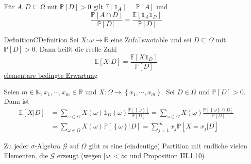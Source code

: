 		 Für $ A, D \subseteq \Omega   $ mit $ \mathbb{P} \left[ D \right]> 0 $ gilt $ \mathbb{E} [ \mathbb{1}_A ] = \mathbb{P} \left[ A \right]$ und 
		 $$ \frac{ \mathbb{P} \left[ A \cap D \right]}{ \mathbb{P} \left[ D \right]} = \frac{ \mathbb{E} \left[ \mathbb{1}_{A} \mathbb{1}_{D} \right]}{ \mathbb{P} \left[ D \right]}  $$
		 
\begin{ibox}[2.4]{Definition}{CDefinition}
    Sei $ X : \omega  \to \mathbb{R} $ eine Zufallsvariable und sei $ D \subseteq \Omega  $ mit $ \mathbb{P} \left[ D \right] >0 $. Dann
		heißt die reelle Zahl  
		$$ \mathbb{E} \left[ X | D \right] = \frac{ \mathbb{E} \left[ X \mathbb{1}_D \right]}{ \mathbb{P} \left[ D \right]}  $$
		\underline{elementare bedingte Erwartung}
\end{ibox}

Seien $ m \in \mathbb{N}, x_1 , \cdots,  x_m \in \mathbb{R} $  und $ X : \Omega  \to \left\{ x_1 , \cdots,  x_m \right\} $. Sei $ D \in 
\Omega $ und $ \mathbb{P} \left[ D \right] >0 $. Dann ist 
\begin{align*}
	\mathbb{E} \left[ X | D \right] &= \sum_{\omega \in \Omega } X (\omega) \mathbb{1}_{D} (\omega) \frac{\mathbb{P} \left[ \left\{ \omega  \right\} \right]}{\mathbb{P} \left[ D \right]}  =  \sum_{\omega \in \Omega }X (\omega) \frac{\mathbb{P} \left[ \left\{ \omega  \right\} \cap D \right]}{ \mathbb{P} \left[ D \right]} \\ 
	&= \sum_{\omega \in \Omega } X (\omega) \mathbb{P} \left[ \left\{ \omega  \right\} | D \right] = \sum_{j=1}^{m}x_j \mathbb{P} \left[ X = x_j | D \right]
\end{align*}

Zu jeder $\sigma$-Algebra $ \mathcal{G} $ auf $ \Omega  $ gibt es eine (eindeutige) Partition mit endliche vielen Elementen, die $ \mathcal{G} $ erzeugt (wegen $ \left| \omega  \right| < \infty $ und Proposition III.1.10)

